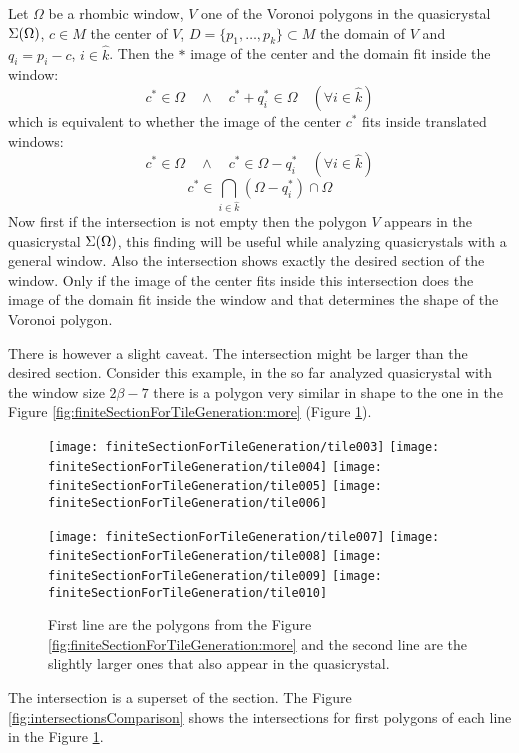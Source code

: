 \documentclass[text.tex]{subfiles}
\begin{document}
Let $\Omega$ be a rhombic window, $V$ one of the Voronoi polygons in the quasicrystal $\Sigma(\Omega)$, $c\in M$ the center of $V$, $D = \{p_1,\dots,p_k\}\subset M$ the domain of $V$ and $q_i = p_i - c$, $i\in\hat{k}$.
Then the $\ast$ image of the center and the domain fit inside the window:
$$c^\ast\in\Omega \quad\wedge\quad c^\ast + q_i^\ast\in\Omega \quad(\forall i\in\hat{k})$$
which is equivalent to whether the image of the center $c^\ast$ fits inside translated windows:
$$c^\ast\in\Omega \quad\wedge\quad c^\ast\in\Omega-q_i^\ast \quad(\forall i\in\hat{k})$$
$$c^\ast\in\bigcap\limits_{i\in\hat{k}}(\Omega-q_i^\ast)\cap\Omega$$
Now first if the intersection is not empty then the polygon $V$ appears in the quasicrystal $\Sigma(\Omega)$, this finding will be useful while analyzing quasicrystals with a general window. Also the intersection shows exactly the desired section of the window. Only if the image of the center fits inside this intersection does the image of the domain fit inside the window and that determines the shape of the Voronoi polygon. 

There is however a slight caveat. The intersection might be larger than the desired section. Consider this example, in the so far analyzed quasicrystal with the window size $2\beta-7$ there is a polygon very similar in shape to the one in the Figure \ref{fig:finiteSectionForTileGeneration:more} (Figure \ref{fig:finiteSectionForTileGeneration:bigger}).
\begin{figure}[h]
\centering
\texttt{[image: finiteSectionForTileGeneration/tile003]}
\texttt{[image: finiteSectionForTileGeneration/tile004]}
\texttt{[image: finiteSectionForTileGeneration/tile005]}
\texttt{[image: finiteSectionForTileGeneration/tile006]}

\texttt{[image: finiteSectionForTileGeneration/tile007]}
\texttt{[image: finiteSectionForTileGeneration/tile008]}
\texttt{[image: finiteSectionForTileGeneration/tile009]}
\texttt{[image: finiteSectionForTileGeneration/tile010]}
\caption{First line are the polygons from the Figure \ref{fig:finiteSectionForTileGeneration:more} and the second line are the slightly larger ones that also appear in the quasicrystal.}
\label{fig:finiteSectionForTileGeneration:bigger}
\end{figure}

The intersection is a superset of the section. The Figure \ref{fig:intersectionsComparison} shows the intersections for first polygons of each line in the Figure \ref{fig:finiteSectionForTileGeneration:bigger}.
\end{document}
